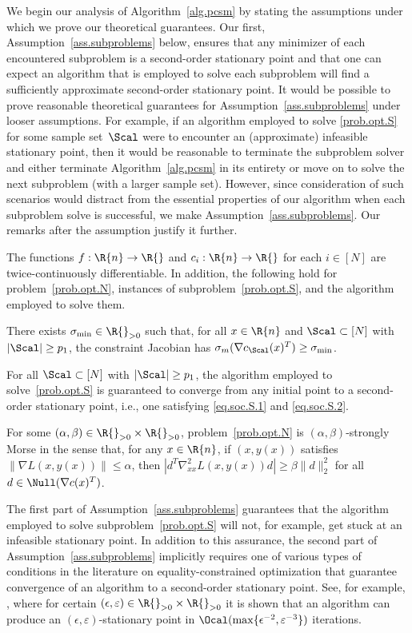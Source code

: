 We begin our analysis of Algorithm~\ref{alg.pcsm} by stating the assumptions under which we prove our theoretical guarantees.  Our first, Assumption~\ref{ass.subproblems} below, ensures that any minimizer of each encountered subproblem is a second-order stationary point and that one can expect an algorithm that is employed to solve each subproblem will find a sufficiently approximate second-order stationary point.  It would be possible to prove reasonable theoretical guarantees for Assumption~\ref{ass.subproblems} under looser assumptions.  For example, if an algorithm employed to solve \eqref{prob.opt.S} for some sample set~$\Scal$ were to encounter an (approximate) infeasible stationary point, then it would be reasonable to terminate the subproblem solver and either terminate Algorithm~\ref{alg.pcsm} in its entirety or move on to solve the next subproblem (with a larger sample set).  However, since consideration of such scenarios would distract from the essential properties of our algorithm when each subproblem solve is successful, we make Assumption~\ref{ass.subproblems}.  Our remarks after the assumption justify it further.

\bassumption\label{ass.subproblems}
  The functions $f : \R{n} \to \R{}$ and $c_i : \R{n} \to \R{}$ for each $i \in [N]$ are twice-continuously differentiable.  In addition, the following hold for problem~\eqref{prob.opt.N}, instances of subproblem~\eqref{prob.opt.S}, and the algorithm employed to solve them.
  \benumerate
    \item[(a)] There exists $\sigma_{\min} \in \R{}_{>0}$ such that, for all $x \in \R{n}$ and $\Scal \subset [N]$ with $|\Scal| \geq p_1$, the constraint Jacobian has $\sigma_m(\nabla c_\Scal(x)^T) \geq \sigma_{\min}$.
    \item[(b)] For all $\Scal \subset [N]$ with $|\Scal| \geq p_1$, the algorithm employed to solve~\eqref{prob.opt.S} is guaranteed to converge from any initial point to a second-order stationary point, i.e., one satisfying \eqref{eq.soc.S.1} and \eqref{eq.soc.S.2}.
    \item[(c)] For some $(\alpha,\beta) \in \R{}_{>0} \times \R{}_{>0}$, problem~\eqref{prob.opt.N} is $(\alpha,\beta)$-strongly Morse in the sense that, for any $x \in \R{n}$, if $(x,y(x))$ satisfies $\| \nabla L(x,y(x)) \| \leq \alpha$, then $|d^T \nabla_{xx}^2 L(x,y(x)) d| \geq \beta \|d\|_2^2$ for all $d \in \Null(\nabla c(x)^T)$.
  \eenumerate
\eassumption

The first part of Assumption~\ref{ass.subproblems} guarantees that the algorithm employed to solve subproblem~\eqref{prob.opt.S} will not, for example, get stuck at an infeasible stationary point.  In addition to this assurance, the second part of Assumption~\ref{ass.subproblems} implicitly requires one of various types of conditions in the literature on equality-constrained optimization that guarantee convergence of an algorithm to a second-order stationary point. See, for example, \cite{GoyeEfteBoum2024}, where for certain $(\epsilon,\varepsilon) \in \R{}_{>0} \times \R{}_{>0}$ it is shown that an algorithm can produce an $(\epsilon,\varepsilon)$-stationary point in $\Ocal(\max\{\epsilon^{-2}, \varepsilon^{-3}\})$ iterations.

